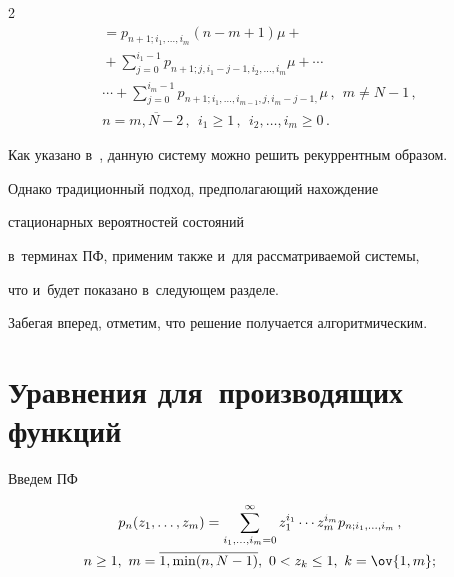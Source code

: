 \begin{multicols}{2}
\begin{multline}
= p_{n+1;i_1,\ldots,i_{m}} (n-m+1) \mu


+ {}\\


{}+\sum\limits_{j=0}^{i_1-1} p_{n+1;j,i_1-j-1,i_2,\ldots,i_{m}} \mu


+  \cdots {}\\


{}\cdots +


\sum\limits_{j=0}^{i_m-1} p_{n+1;i_1,\ldots,i_{m-1},j,i_m-j-1,} \mu\,,\ \  


m\ne N-1\,,\\


 n=\overline{m,N-2}\,,\ \ i_1 \ge 1\,,\ \ i_2,\ldots,i_{m}\ge 0\,.


\end{multline}





Как указано в~\cite{pr2015}, данную систему можно решить рекуррентным образом.


Однако традиционный подход, предполагающий нахождение


стационарных вероятностей состояний


в~терминах ПФ, применим также и~для рас\-смат\-ри\-ва\-емой системы,


что и~будет показано в~сле\-ду\-ющем разделе.


Забегая вперед, отметим, что решение получается алгоритмическим.





\section{Уравнения для~производящих функций}





Введем ПФ


\begin{multline*}


p_{n}(z_1,\ldots,z_m) = \sum\limits_{i_1,\dots , i_m=0}^{\infty}


z_1^{i_1} \cdots z_m^{i_m} p_{n;i_1,\ldots,i_m}\,,\\ 


n\ge1, \  m=\overline{1,\min(n,N-1)},  \  0<z_k \le 1, \  k=\ov{1,m};


\end{multline*}






\end{multicols}
